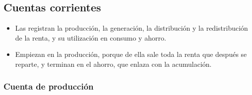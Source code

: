 \documentclass[11pt]{article}
\begin{document}
\subsection{Cuentas corrientes}\label{sec:corrientes}

\begin{itemize}
\item Las  registran la producción, la generación, la distribución y la redistribución de la renta, y su utilización en consumo y ahorro.
\item Empiezan en la producción, porque de ella sale toda la renta que después se reparte, y terminan en el ahorro, que enlaza con la acumulación.
\end{itemize}

\subsubsection{Cuenta de producción}\label{sec:produccion}
\end{document}
